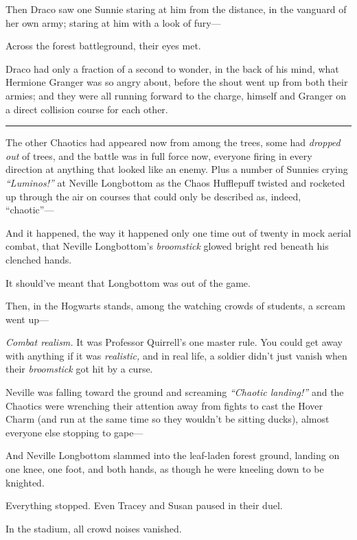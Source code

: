 Then Draco saw one Sunnie staring at him from the distance, in the
vanguard of her own army; staring at him with a look of fury---

Across the forest battleground, their eyes met.

Draco had only a fraction of a second to wonder, in the back of his
mind, what Hermione Granger was so angry about, before the shout went up
from both their armies; and they were all running forward to the charge,
himself and Granger on a direct collision course for each other.

\begin{center}\rule{3in}{0.4pt}\end{center}

The other Chaotics had appeared now from among the trees, some had
\emph{dropped out} of trees, and the battle was in full force now,
everyone firing in every direction at anything that looked like an
enemy. Plus a number of Sunnies crying \emph{``Luminos!''} at Neville
Longbottom as the Chaos Hufflepuff twisted and rocketed up through the
air on courses that could only be described as, indeed, ``chaotic''---

And it happened, the way it happened only one time out of twenty in mock
aerial combat, that Neville Longbottom's \emph{broomstick} glowed bright
red beneath his clenched hands.

It should've meant that Longbottom was out of the game.

Then, in the Hogwarts stands, among the watching crowds of students, a
scream went up---

\emph{Combat realism.} It was Professor Quirrell's one master rule. You
could get away with anything if it was \emph{realistic,} and in real
life, a soldier didn't just vanish when their \emph{broomstick} got hit
by a curse.

Neville was falling toward the ground and screaming \emph{``Chaotic
landing!''} and the Chaotics were wrenching their attention away from
fights to cast the Hover Charm (and run at the same time so they
wouldn't be sitting ducks), almost everyone else stopping to gape---

And Neville Longbottom slammed into the leaf-laden forest ground,
landing on one knee, one foot, and both hands, as though he were
kneeling down to be knighted.

Everything stopped. Even Tracey and Susan paused in their duel.

In the stadium, all crowd noises vanished.

